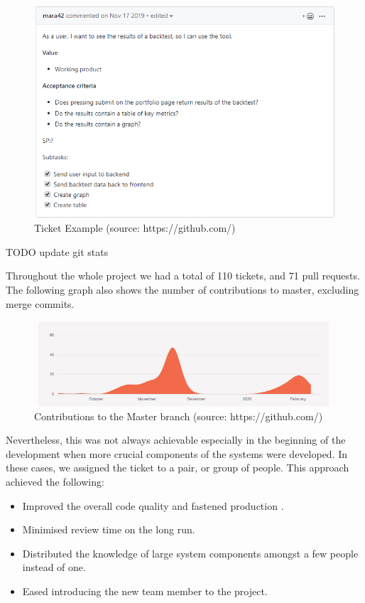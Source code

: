 \begin{figure}[H]
   \centering
   \includegraphics[scale=0.7]{06Coding/05Pictures/ticket.png}
   \caption{Ticket Example (source: https://github.com/)}
   \label{Ticket}
\end{figure}

TODO update git stats

Throughout the whole project we had a total of 110 tickets, and 71 pull requests. The following graph also shows the number of contributions to master, excluding merge commits.

\begin{figure}[H]
   \centering
   \includegraphics[width=\textwidth]{06Coding/05Pictures/contributions.jpg}
   \caption{Contributions to the Master branch (source: https://github.com/)}
\end{figure}

Nevertheless, this was not always achievable especially in the beginning of the development when more crucial components of the systems were developed. In these cases, we assigned the ticket to a pair, or group of people. This approach achieved the following:

\begin{itemize}
    \item Improved the overall code quality and fastened production \cite{pairprogramming}.
    \item Minimised review time on the long run.
    \item Distributed the knowledge of large system components amongst a few people instead of one.
    \item Eased introducing the new team member to the project.
\end{itemize}


